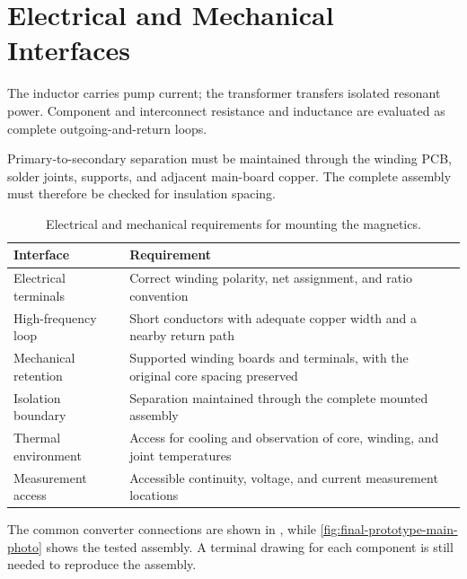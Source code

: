 \section{Electrical and Mechanical Interfaces}
\label{sec:mag-requirements}

The inductor carries pump current; the transformer transfers isolated resonant power. Component and interconnect resistance and inductance are evaluated as complete outgoing-and-return loops.

Primary-to-secondary separation must be maintained through the winding PCB, solder joints, supports, and adjacent main-board copper. The complete assembly must therefore be checked for insulation spacing.

\begin{table}[htbp]
\centering
\caption{Electrical and mechanical requirements for mounting the magnetics.}
\label{tab:mag-integration-requirements}
\begin{tabularx}{\textwidth}{@{}p{}X@{}}
\toprule
Interface & Requirement\\
\midrule
Electrical terminals & Correct winding polarity, net assignment, and ratio convention\\
High-frequency loop & Short conductors with adequate copper width and a nearby return path\\
Mechanical retention & Supported winding boards and terminals, with the original core spacing preserved\\
Isolation boundary & Separation maintained through the complete mounted assembly\\
Thermal environment & Access for cooling and observation of core, winding, and joint temperatures\\
Measurement access & Accessible continuity, voltage, and current measurement locations\\
\bottomrule
\end{tabularx}
\end{table}

The common converter connections are shown in , while \cref{fig:final-prototype-main-photo} shows the tested assembly. A terminal drawing for each component is still needed to reproduce the assembly.
